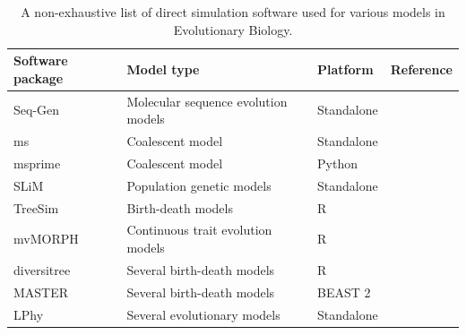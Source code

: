 \documentclass[oneside]{article}
\begin{document}
\begin{center}
  \begin{table}[h]
  \caption{A non-exhaustive list of direct simulation software used for various models in Evolutionary Biology.}
  \label{tab:sim}
  \centering
  \begin{tabular}{ p{0.7in} | p{1.5in} | p{1in} | p{1.3in} }
    \hline
    Software package & Model type & Platform & Reference \\
    \hline  
    Seq-Gen & Molecular sequence evolution models & Standalone & \citealp{rambaut97} \\
    ms & Coalescent model & Standalone & \citealp{hudson02}\\
    msprime & Coalescent model & Python & \citealp{kelleher16}\\
    SLiM & Population genetic models & Standalone & \citealp{haller19}\\    
    TreeSim & Birth-death models & R & \citealp{stadler11}\\
    mvMORPH & Continuous trait evolution models & R & \citealp{clavel15}\\
    diversitree & Several birth-death models & R & \citealp{revell12}\\
    MASTER & Several birth-death models & BEAST 2 & \citealp{vaughan13}\\
    LPhy & Several evolutionary models & Standalone & \citealp{drummond22}\\ 
    \hline
  \end{tabular}
  \end{table}
\end{center}



\end{document}
